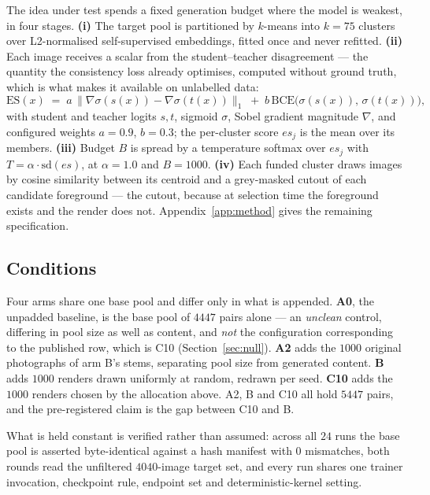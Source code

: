 \documentclass{article} %
\begin{document}
The idea under test spends a fixed generation budget where the model is weakest, in four stages.
\textbf{(i)} The target pool is partitioned by $k$-means into $k=75$ clusters over L2-normalised
self-supervised embeddings, fitted once and never refitted. \textbf{(ii)} Each image receives a scalar
from the student--teacher disagreement --- the quantity the consistency loss already optimises,
computed without ground truth, which is what makes it available on unlabelled data:
\begin{equation}
\mathrm{ES}(x) \;=\; a \,\big\| \nabla \sigma(s(x)) - \nabla \sigma(t(x)) \big\|_{1}
\;+\; b \, \mathrm{BCE}\big( \sigma(s(x)),\, \sigma(t(x)) \big),
\label{eq:es}
\end{equation}
with student and teacher logits $s,t$, sigmoid $\sigma$, Sobel gradient magnitude $\nabla$, and
configured weights $a=0.9$, $b=0.3$; the per-cluster score $\mathit{es}_j$ is the mean over its
members. \textbf{(iii)} Budget $B$ is spread by a temperature softmax over $\mathit{es}_j$ with
$T = \alpha \cdot \mathrm{sd}(\mathit{es})$, at $\alpha = 1.0$ and $B = 1000$. \textbf{(iv)} Each
funded cluster draws images by cosine similarity between its centroid and a grey-masked cutout of each
candidate foreground --- the cutout, because at selection time the foreground exists and the render
does not. Appendix~\ref{app:method} gives the remaining specification.

\subsection{Conditions}
\label{sec:method-arms}

Four arms share one base pool and differ only in what is appended. \textbf{A0}, the unpadded baseline,
is the base pool of $4447$ pairs alone --- an \emph{unclean} control, differing in pool size as well
as content, and \emph{not} the configuration corresponding to the published row, which is C10
(Section~\ref{sec:null}). \textbf{A2} adds the $1000$ original
photographs of arm B's stems, separating pool size from generated content. \textbf{B} adds $1000$
renders drawn uniformly at random, redrawn per seed. \textbf{C10} adds the $1000$ renders chosen by the
allocation above. A2, B and C10 all hold $5447$ pairs, and the pre-registered claim is the gap between
C10 and B.

What is held constant is verified rather than assumed: across all $24$ runs the base pool is asserted
byte-identical against a hash manifest with $0$ mismatches, both rounds read the unfiltered
$4040$-image target set, and every run shares one trainer invocation, checkpoint rule, endpoint set and
deterministic-kernel setting.
\end{document}
